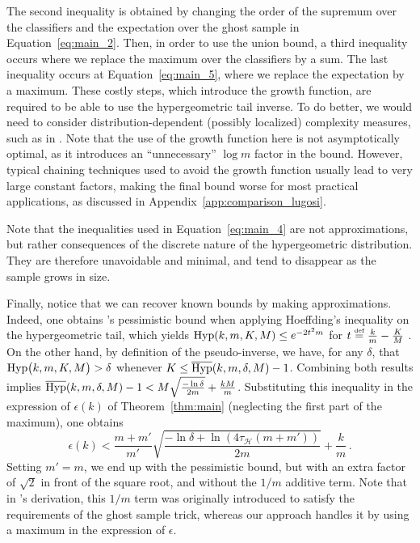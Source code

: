 \documentclass[twoside,11pt]{article}
\renewcommand{\H}{{\mathcal{H}}}
\newcommand{\eqdef}{\overset{\smash{\mbox{\tiny \rm def}}}{=}}
\newcommand{\Hyp}{\textnormal{Hyp}}
\newcommand{\HypInv}{\overline{\textnormal{Hyp}}}
\begin{document}
The second inequality is obtained by changing the order of the supremum over the classifiers and the expectation over the ghost sample in Equation~\eqref{eq:main_2}.
Then, in order to use the union bound, a third inequality occurs where we replace the maximum over the classifiers by a sum.
The last inequality occurs at Equation~\eqref{eq:main_5}, where we replace the expectation by a maximum.
These costly steps, which introduce the growth function, are required to be able to use the hypergeometric tail inverse.
To do better, we would need to consider distribution-dependent (possibly localized) complexity measures, such as in \citet{oneto2016local,zhivotovskiy18localization}.
Note that the use of the growth function here is not asymptotically optimal, as it introduces an ``unnecessary'' $\log m$ factor in the bound.
However, typical chaining techniques used to avoid the growth function usually lead to very large constant factors, making the final bound worse for most practical applications, as discussed in Appendix~\ref{app:comparison_lugosi}.

Note that the inequalities used in Equation~\eqref{eq:main_4} are not approximations, but rather consequences of the discrete nature of the hypergeometric distribution.
They are therefore unavoidable and minimal, and tend to disappear as the sample grows in size.

Finally, notice that we can recover known bounds by making approximations.
Indeed, one obtains \citeauthor{vapnik98}'s pessimistic bound when applying Hoeffding's inequality on the hypergeometric tail, which yields $\Hyp(k,m,K,M) \le e^{-2t^2m}$ for $t \eqdef \frac{k}{m} - \frac{K}{M}$ \citep{chvatal1979tail}.
On the other hand, by definition of the pseudo-inverse, we have, for any $\delta$, that $\Hyp\big(k,m,K,M\big) > \delta$ whenever $K \le \HypInv(k,m,\delta,M)-1$.
Combining both results implies $\HypInv(k,m,\delta,M) - 1 < M\sqrt{\frac{-\ln\delta}{2m}} + \frac{kM}{m}$.
Substituting this inequality in the expression of $\epsilon(k)$ of Theorem~\ref{thm:main} (neglecting the first part of the maximum), one obtains
\begin{equation*}\label{eq:bound_hoeffding_reduction}
    \epsilon(k) < \frac{m+m'}{m'}\sqrt{\frac{-\ln\delta+\ln(4\tau_\H(m+m'))}{2m}} + \frac{k}{m}\, .
\end{equation*}
Setting $m'=m$, we end up with the pessimistic bound, but with an extra factor of $\sqrt{2}$ in front of the square root, and without the $1/m$ additive term.
Note that in \citeauthor{vapnik98}'s derivation, this $1/m$ term was originally introduced to satisfy the requirements of the ghost sample trick, whereas our approach handles it by using a maximum in the expression of $\epsilon$.
\end{document}
